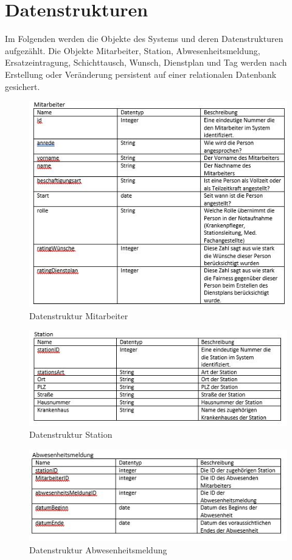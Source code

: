 \documentclass[11pt,
paper=a4,
bibtotocnumbered,	  %
liststotocnumbered,  %
DIV=calc,		  %
tablecaptionabove,	  %
headinclude,
]{article}
\begin{document}
\section{Datenstrukturen}
Im Folgenden werden die Objekte des Systems und deren Datenstrukturen aufgezählt.
Die Objekte Mitarbeiter, Station, Abwesenheitsmeldung, Ersatzeintragung, Schichttausch, Wunsch, Dienstplan und Tag werden nach Erstellung oder Veränderung persistent auf einer relationalen Datenbank gesichert. 
\begin{figure}[H]
\includegraphics[width=1\textwidth]{Bilder/Dmitarbeiter.jpg}
\caption{Datenstruktur Mitarbeiter}
\end{figure}
\begin{figure}[H]
\includegraphics[width=1\textwidth]{Bilder/Dstation.jpg}
\caption{Datenstruktur Station}
\end{figure}
\begin{figure}[H]
\includegraphics[width=1\textwidth]{Bilder/Dabwesenheit.jpg}
\caption{Datenstruktur Abwesenheitsmeldung}
\end{figure}
\end{document}
